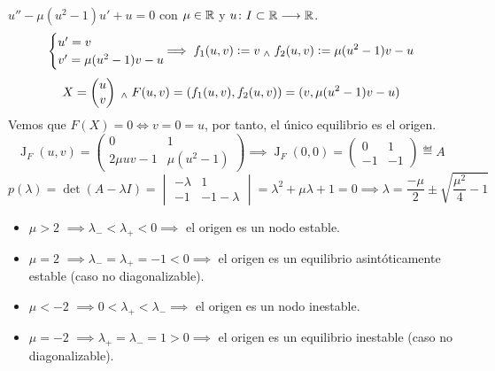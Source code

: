 \begin{ejem}
	$u'' - \mu(u^2 - 1)u' + u = 0$ con $\mu \in \mathbb{R}$ y $u \colon I\subset \mathbb{R} \longrightarrow \mathbb{R}$.
	\[\begin{cases}
			u' = v \\
			v' = \mu(u^2 - 1)v - u
		\end{cases} \hspace{-0.5cm} \implies f_1(u, v) \defeq v \we f_2(u, v) \defeq \mu(u^2 - 1)v - u\]
	\[X = \begin{pmatrix}
			u \\
			v
		\end{pmatrix} \; _{\wedge} \; F(u, v) = (f_1(u, v), f_2(u, v)) = (v, \mu(u^2 - 1)v - u)\]
	Vemos que $F(X) = 0 \iff v = 0 = u$, por tanto, el único equilibrio es el origen.
	\[\operatorname{J}_F(u, v) = \begin{pmatrix}
			0           & 1            \\
			2\mu uv - 1 & \mu(u^2 - 1)
		\end{pmatrix} \implies \operatorname{J}_F(0, 0) = \begin{pmatrix}
			0  & 1  \\
			-1 & -1
		\end{pmatrix} \eqdef A\]
	\[p(\lambda) = \det(A - \lambda I) = \begin{vmatrix}
			-\lambda & 1          \\
			-1       & -1-\lambda
		\end{vmatrix} = \lambda^2 + \mu \lambda + 1 = 0 \implies \lambda = \frac{-\mu}{2} \pm \sqrt{\frac{\mu^2}{4} - 1}\]
	\begin{itemize}
		\item $\mu > 2$ $\implies \lambda_- < \lambda_+ < 0 \implies$ el origen es un nodo estable.
		\item $\mu = 2$ $\implies \lambda_- = \lambda_+ = -1 < 0 \implies$ el origen es un equilibrio asintóticamente estable (caso no diagonalizable).
		\item $\mu < -2$ $\implies 0 < \lambda_+ < \lambda_- \implies$ el origen es un nodo inestable.
		\item $\mu = -2$ $\implies \lambda_+ = \lambda_- = 1 > 0 \implies$ el origen es un equilibrio inestable (caso no diagonalizable).

\end{itemize}
\end{ejem}
